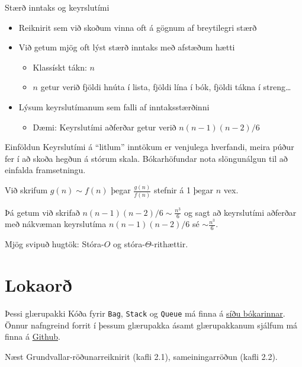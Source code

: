 \documentclass{beamer}
\begin{document}
\begin{frame}{Stærð inntaks og keyrslutími}
	\begin{itemize}
		\item Reiknirit sem við skoðum vinna oft á gögnum af breytilegri stærð
		\item Við getum mjög oft lýst stærð inntaks með afstæðum hætti
		      \begin{itemize}
			      \item Klassískt tákn: $n$
			      \item $n$ getur verið fjöldi hnúta í lista, fjöldi lína í bók, fjöldi tákna í streng\ldots
		      \end{itemize}
		\item Lýsum keyrslutímanum sem falli af inntaksstærðinni
		      \begin{itemize}
			      \item Dæmi: Keyrslutími aðferðar getur verið $n(n-1)(n-2)/6$
		      \end{itemize}
	\end{itemize}
\end{frame}

\begin{frame}{Einföldun}
	Keyrslutími á ``litlum'' inntökum er venjulega hverfandi, meira púður fer í að skoða hegðun á stórum skala. Bókarhöfundar nota slöngunálgun  til að einfalda framsetningu.
	\begin{tcolorbox}
		Við skrifum $g(n) \sim f(n)$ þegar $\frac{g(n)}{f(n)}$ stefnir á 1 þegar $n$ vex.
	\end{tcolorbox}
	Þá getum við skrifað $n(n-1)(n-2)/6 \sim \frac{n^3}{6}$ og sagt að keyrslutími aðferðar með nákvæman keyrslutíma $n(n-1)(n-2)/6$ sé $\sim \frac{n^3}{6}$.

	\vspace{1cm}
	Mjög svipuð hugtök: Stóra-$O$ og stóra-$\Theta$-rithættir.
\end{frame}

\section{Lokaorð}

\begin{frame}{Þessi glærupakki}
	Kóða fyrir \texttt{Bag}, \texttt{Stack} og \texttt{Queue} má finna á \href{http://algs4.cs.princeton.edu/code/}{síðu bókarinnar}. Önnur nafngreind forrit í þessum glærupakka ásamt glærupakkanum sjálfum má finna á \href{https://github.com/Ernir/kennsluefni/tree/master/T2/Code/w5}{Github}.

\end{frame}

\begin{frame}{Næst}
	Grundvallar-röðunarreiknirit (kafli 2.1), sameiningarröðun (kafli 2.2).
\end{frame}
\end{document}
